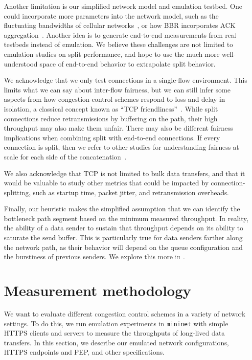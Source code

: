 Another limitation is our simplified network model and emulation testbed.
One could incorporate more parameters into the network model, such as the
fluctuating bandwidths of cellular networks~\cite{hayes2019mmwave}, or how BBR
incorporates ACK aggregation~\cite{cardwell2018bbr-ietf101}. Another idea is to
generate end-to-end measurements from real testbeds instead of emulation. We
believe these challenges are not limited to emulation studies on split
performance, and hope to use the much more well-understood space of end-to-end
behavior to extrapolate split behavior.

We acknowledge that we only test connections in a single-flow environment.
This limits what we can say about inter-flow fairness, but we can still infer
some aspects from how congestion-control schemes respond to loss and delay in
isolation, a classical concept known as ``TCP friendliness''~\cite{rfc5348}.
While split connections reduce retransmissions by buffering on the path,
their high throughput may also make them unfair. There may also be different
fairness implications when combining split with end-to-end connections.
If every connection is split, then we refer to other studies for understanding
fairness at scale for each side of the concatenation~\cite
{philip2021revisiting}.

We also acknowledge that TCP is not limited to bulk data transfers, and that
it would be valuable to study other metrics that could be impacted by
connection-splitting, such as startup time, packet jitter, and retransmission
overheads.

Finally, our heuristic makes the simplified assumption that we can identify the
bottleneck path segment based on the minimum measured throughput. In reality,
the ability of a data sender to sustain that throughput depends on its ability
to saturate the send buffer. This is particularly true for data senders farther
along the network path, as their behavior will depend on the queue
configuration and the burstiness of previous senders. We explore this more
in .

\section{Measurement methodology}
\label{sec:splitting:methodology}




We want to evaluate different congestion control schemes in a variety of network
settings. To do this, we run emulation experiments in \texttt{mininet} with
simple HTTPS clients and servers to measure the throughputs of long-lived data
transfers. In this section,
we describe our emulated network configurations, HTTPS endpoints and
PEP, and other specifications.

